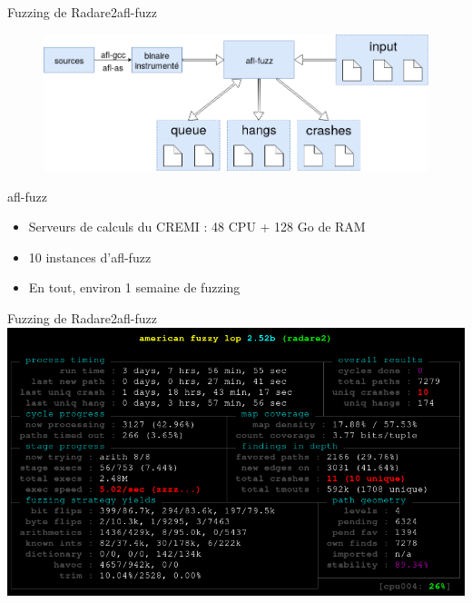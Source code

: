 \begin{frame}{Fuzzing de Radare2}{afl-fuzz}
  \begin{figure}
    \includegraphics[width=0.98\linewidth]{../medias/afl-overview.png}
  \end{figure}

  \pause

  \begin{exampleblock}{afl-fuzz}
    \begin{itemize}
    \item{Serveurs de calculs du CREMI : 48 CPU + 128 Go de RAM}
    \item{10 instances d'afl-fuzz}
    \item{En tout, environ 1 semaine de fuzzing}
    \end{itemize}
  \end{exampleblock}

\end{frame}

\begin{frame}{Fuzzing de Radare2}{afl-fuzz}
  \includegraphics[width=\linewidth]{../medias/afl-fuzz.png}
\end{frame}

